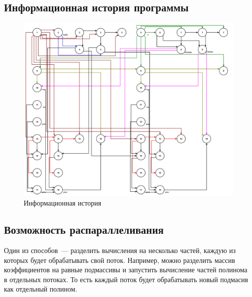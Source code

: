 \clearpage

\subsection{Информационная история программы}

\begin{figure}[h]
	\centering
	\includegraphics[height=0.5\textheight]{img/информационная_история.pdf}
	\caption{Информационная история}
	\label{fg:ii}
\end{figure}

\subsection*{Возможность распараллеливания}

Один из способов~--- разделить вычисления на несколько частей, каждую из которых будет обрабатывать свой поток. 
Например, можно разделить массив коэффициентов на равные подмассивы и запустить вычисление частей полинома в отдельных потоках. 
То есть каждый поток будет обрабатывать новый подмасив как отдельный полином.